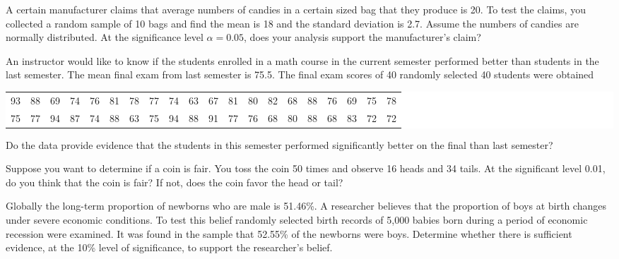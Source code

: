 \begin{example}

A certain manufacturer claims that average numbers of candies in a
certain sized bag that they produce is 20. To test the claims, you
collected a random sample of 10 bags and find the mean is 18 and the
standard deviation is 2.7. Assume the numbers of candies are normally
distributed. At the significance level \(\alpha=0.05\), does your
analysis support the manufacturer's claim?

\end{example}
\vspace*{8\baselineskip}

\begin{example}

An instructor would like to know if the students enrolled in a math
course in the current semester performed better than students in the
last semester. The mean final exam from last semester is 75.5. The final
exam scores of 40 randomly selected 40 students were obtained

\begin{fullwidth}
  \colorbox{white}{
    \parbox{\linewidth}{
      \raggedleft
      \begin{tabular}{*{20}{c}}
        93 & 88 & 69 & 74 & 76 & 81 & 78 & 77 & 74 & 63 & 67 & 81 & 80 & 82 & 68 & 88 & 76 & 69 & 75 & 78\\
        75 & 77 & 94 & 87 & 74 & 88 & 63 & 75 & 94 & 88 & 91 & 77 & 76 & 68 & 80 & 88 & 68 & 83 & 72 & 72
      \end{tabular}
    }
  }
\end{fullwidth}

Do the data provide evidence that the students in this semester
performed significantly better on the final than last semester?

\end{example}
\vspace*{8\baselineskip}

\begin{example}

Suppose you want to determine if a coin is fair. You toss the coin 50
times and observe 16 heads and 34 tails. At the significant level 0.01,
do you think that the coin is fair? If not, does the coin favor the head
or tail?

\end{example}
\vspace*{8\baselineskip}

\begin{example}

Globally the long-term proportion of newborns who are male is 51.46\%. A
researcher believes that the proportion of boys at birth changes under
severe economic conditions. To test this belief randomly selected birth
records of 5,000 babies born during a period of economic recession were
examined. It was found in the sample that 52.55\% of the newborns were
boys. Determine whether there is sufficient evidence, at the 10\% level
of significance, to support the researcher's belief.

\end{example}
\vspace*{8\baselineskip}

